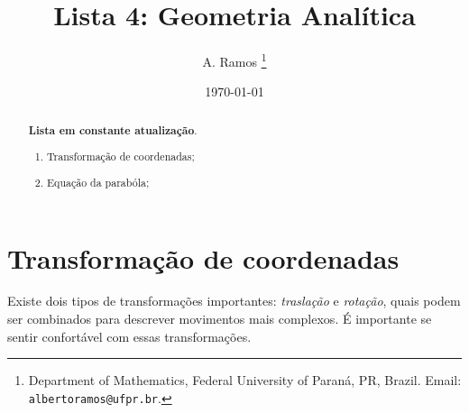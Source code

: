 \documentclass{article}
\begin{document}
\title{Lista 4: Geometria Analítica}

\author{
A. Ramos \thanks{Department of Mathematics,
    Federal University of Paraná, PR, Brazil.
    Email: {\tt albertoramos@ufpr.br}.}
}

\date{\today}
 
\maketitle

\begin{abstract}
{\bf Lista em constante atualização}.
 \begin{enumerate}
 \item Transformação de coordenadas;
 \item Equação da parabóla; %
 \end{enumerate}
\end{abstract}


\section*{Transformação de coordenadas}
 Existe dois tipos de transformações importantes: {\it traslação} e {\it rotação}, quais podem ser combinados para descrever movimentos mais complexos. É importante se sentir confortável com essas transformações.
 
  
\end{document}
